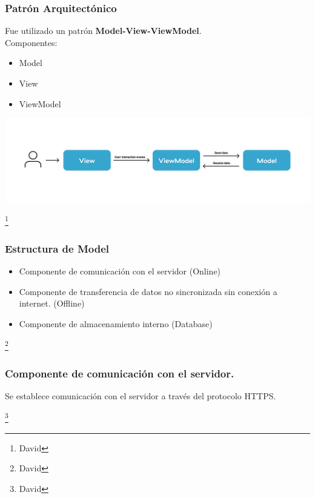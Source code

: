 \documentclass[14pt]{beamer}
\begin{document}
\begin{frame}
\frametitle{Patrón Arquitectónico}

Fue utilizado un patrón \textbf{Model-View-ViewModel}.
\\
Componentes:
\begin{itemize}
\item Model
\item View
\item ViewModel
\end{itemize}

\begin{center}

\includegraphics[scale =0.2]{Images/MVVMwip.png}


\end{center}


\footnote{David}
\end{frame}





\begin{frame}
\frametitle{Estructura de Model}

\begin{itemize}
\item Componente de comunicación con el servidor (Online)

\item Componente de transferencia de datos no sincronizada sin conexión a internet. (Offline)

\item Componente de almacenamiento interno (Database)

\end{itemize}

\footnote{David}
\end{frame}

\begin{frame}
\frametitle{Componente de comunicación con el servidor.}

\begin{block}{}
Se establece comunicación con el servidor a través del protocolo HTTPS.
\end{block}
\footnote{David}
\end{frame}
\end{document}
